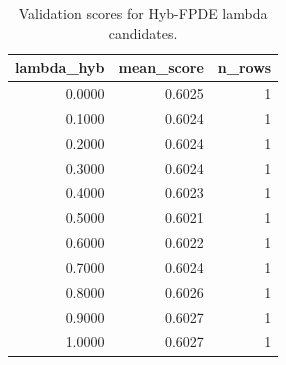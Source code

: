 \begin{table}[t]
\caption{Validation scores for Hyb-FPDE lambda candidates.}
\label{tab:lambda_distribution_computed}
\centering
\begin{tabular}{rrr}
\toprule
lambda\_hyb & mean\_score & n\_rows \\
\midrule
0.0000 & 0.6025 & 1 \\
0.1000 & 0.6024 & 1 \\
0.2000 & 0.6024 & 1 \\
0.3000 & 0.6024 & 1 \\
0.4000 & 0.6023 & 1 \\
0.5000 & 0.6021 & 1 \\
0.6000 & 0.6022 & 1 \\
0.7000 & 0.6024 & 1 \\
0.8000 & 0.6026 & 1 \\
0.9000 & 0.6027 & 1 \\
1.0000 & 0.6027 & 1 \\
\bottomrule
\end{tabular}

\end{table}

